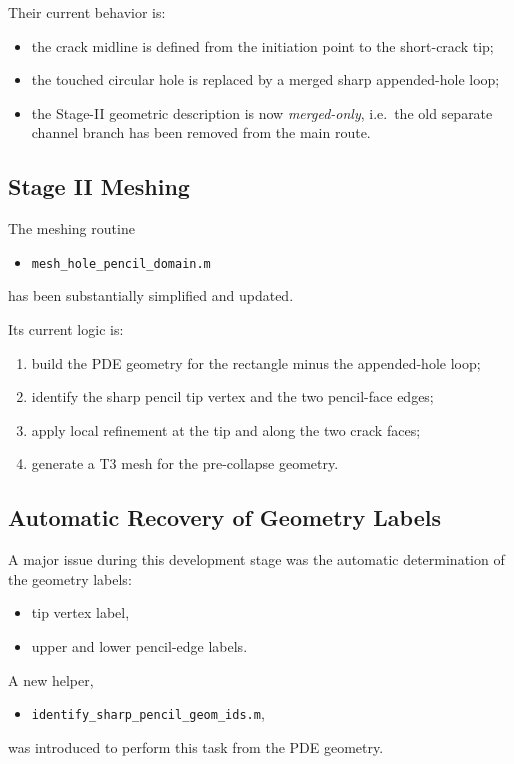 \documentclass[11pt]{article}
\begin{document}
	Their current behavior is:
	\begin{itemize}
		\item the crack midline is defined from the initiation point to the short-crack tip;
		\item the touched circular hole is replaced by a merged sharp appended-hole loop;
		\item the Stage-II geometric description is now \emph{merged-only}, i.e.\ the old separate channel branch has been removed from the main route.
	\end{itemize}
	
	\subsection{Stage II Meshing}
	
	The meshing routine
	\begin{itemize}
		\item \texttt{mesh\_hole\_pencil\_domain.m}
	\end{itemize}
	has been substantially simplified and updated.
	
	Its current logic is:
	\begin{enumerate}
		\item build the PDE geometry for the rectangle minus the appended-hole loop;
		\item identify the sharp pencil tip vertex and the two pencil-face edges;
		\item apply local refinement at the tip and along the two crack faces;
		\item generate a T3 mesh for the pre-collapse geometry.
	\end{enumerate}
	
	\subsection{Automatic Recovery of Geometry Labels}
	
	A major issue during this development stage was the automatic determination of the geometry labels:
	\begin{itemize}
		\item tip vertex label,
		\item upper and lower pencil-edge labels.
	\end{itemize}
	
	A new helper,
	\begin{itemize}
		\item \texttt{identify\_sharp\_pencil\_geom\_ids.m},
	\end{itemize}
	was introduced to perform this task from the PDE geometry.
	
\end{document}
